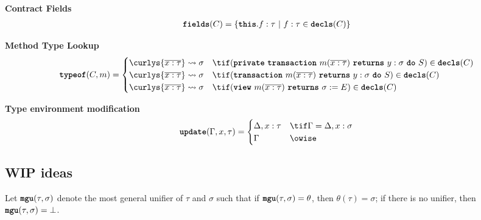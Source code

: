 \documentclass[dvipsnames, usenames, sigconf]{acmart}
\begin{document}
 \textbf{Contract Fields}
\begin{align*}
    \textbf{\texttt{fields}}(C) = \left\{ {\textbf{\texttt{this}}.f : \tau} ~|~ {f : \tau \in \textbf{\texttt{decls}}(C)} \right\}
\end{align*}

 \textbf{Method Type Lookup}
\begin{align*}
    \typeof(C, m) =
    \begin{cases}
        \curlys{\overline{x : \tau}} \transforms \sigma & \tif (\private~\transaction~m(\overline{x : \tau})~\returns~y:\sigma~\doC~S) \in \decls(C) \\
        \curlys{\overline{x : \tau}} \transforms \sigma & \tif (\transaction~m(\overline{x : \tau})~\returns~y:\sigma~\doC~S) \in \decls(C) \\
        \curlys{\overline{x : \tau}} \transforms \sigma & \tif (\view~m(\overline{x : \tau})~\returns~\sigma := E) \in \decls(C)
    \end{cases}
\end{align*}

 \textbf{Type environment modification}
\[
    \update(\Gamma, x, \tau) =
    \begin{cases}
        \Delta, x : \tau & \tif \Gamma = \Delta, x : \sigma \\
        \Gamma & \owise
    \end{cases}
\]

\subsection{WIP ideas}

\newcommand{\Impl}{\textbf{\texttt{implementation}}\xspace}
\newcommand{\of}{\textbf{\texttt{of}}\xspace}
\newcommand{\where}{\textbf{\texttt{where}}\xspace}
\newcommand{\implements}{\textbf{\texttt{implements}}\xspace}
\newcommand{\defaultImpl}{\textbf{\texttt{default}}\xspace}
\newcommand{\return}{\textbf{\texttt{return}}\xspace}
\newcommand{\vars}{\textbf{\texttt{vars}}\xspace}
\newcommand{\mgu}{\textbf{\texttt{mgu}}\xspace}

\begin{definition}
    Let $\mgu(\tau, \sigma)$ denote the most general unifier of $\tau$ and $\sigma$ such that if $\mgu(\tau, \sigma) = \theta$, then $\theta(\tau) = \sigma$; if there is no unifier, then $\mgu(\tau, \sigma) = \bot$.
\end{definition}
\end{document}
